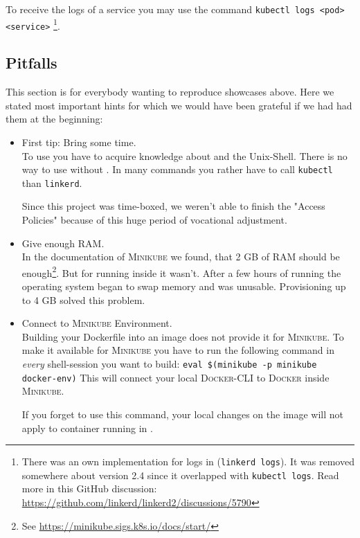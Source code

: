To receive the logs of a service you may use the \kubernetes{} command \lstinline|kubectl logs <pod> <service>|
	\footnote{
		There was an own implementation for logs in \linkerd{} (\lstinline|linkerd logs|). 
		It was removed somewhere about version 2.4 since it overlapped with \lstinline|kubectl logs|.
		Read more in this GitHub discussion:\\
		\url{https://github.com/linkerd/linkerd2/discussions/5790}
	}.

\subsection{Pitfalls}
This section is for everybody wanting to reproduce showcases above.
Here we stated most important hints for which we would have been grateful if we had had them at the beginning:
\begin{itemize}
	\item First tip: Bring some time.\\
	To use \linkerd{} you have to acquire knowledge about \kubernetes{} and the Unix-Shell.
	There is no way to use \linkerd{} without \kubernetes{}.
	In many commands you rather have to call \lstinline|kubectl| than \lstinline|linkerd|.
	
	Since this project was time-boxed, we weren't able to finish the "Access Policies" because of this huge period of vocational adjustment.
	
	\item Give enough RAM.\\
	In the documentation of \textsc{Minikube} we found, that 2 GB of RAM should be enough\footnote{
		See \url{https://minikube.sigs.k8s.io/docs/start/}
	}.
	But for running \linkerd{} inside it wasn't. 
	After a few hours of running the operating system began to swap memory and \kubernetes{} was unusable. 
	Provisioning up to 4 GB solved this problem.

	\item Connect to \textsc{Minikube} Environment.\\
	Building your Dockerfile into an image does not provide it for \textsc{Minikube}.
	To make it available for \textsc{Minikube} you have to run the following command in \textit{every} shell-session you want to build:
	\lstinline|eval $(minikube -p minikube docker-env)|
	This will connect your local \textsc{Docker}-CLI to \textsc{Docker} inside \textsc{Minikube}.
	
	If you forget to use this command, your local changes on the image will not apply to container running in \kubernetes{}.


\end{itemize}
